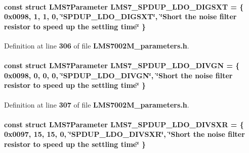 \paragraph[{L\+M\+S7\+\_\+\+S\+P\+D\+U\+P\+\_\+\+L\+D\+O\+\_\+\+D\+I\+G\+S\+XT}]{\setlength{\rightskip}{0pt plus 5cm}const struct {\bf L\+M\+S7\+Parameter} L\+M\+S7\+\_\+\+S\+P\+D\+U\+P\+\_\+\+L\+D\+O\+\_\+\+D\+I\+G\+S\+XT = \{ 0x0098, 1, 1, 0, \char`\"{}\+S\+P\+D\+U\+P\+\_\+\+L\+D\+O\+\_\+\+D\+I\+G\+S\+X\+T\char`\"{}, \char`\"{}\+Short the noise filter resistor to speed up the settling time\char`\"{} \}\hspace{0.3cm}{\ttfamily [static]}}\label{LMS7002M__parameters_8h_ab45f4ce54233a2500de5a14d051e3f05}


Definition at line {\bf 306} of file {\bf L\+M\+S7002\+M\+\_\+parameters.\+h}.

\paragraph[{L\+M\+S7\+\_\+\+S\+P\+D\+U\+P\+\_\+\+L\+D\+O\+\_\+\+D\+I\+V\+GN}]{\setlength{\rightskip}{0pt plus 5cm}const struct {\bf L\+M\+S7\+Parameter} L\+M\+S7\+\_\+\+S\+P\+D\+U\+P\+\_\+\+L\+D\+O\+\_\+\+D\+I\+V\+GN = \{ 0x0098, 0, 0, 0, \char`\"{}\+S\+P\+D\+U\+P\+\_\+\+L\+D\+O\+\_\+\+D\+I\+V\+G\+N\char`\"{}, \char`\"{}\+Short the noise filter resistor to speed up the settling time\char`\"{} \}\hspace{0.3cm}{\ttfamily [static]}}\label{LMS7002M__parameters_8h_ab45a2aff27856fa45303719648c3e2c4}


Definition at line {\bf 307} of file {\bf L\+M\+S7002\+M\+\_\+parameters.\+h}.

\paragraph[{L\+M\+S7\+\_\+\+S\+P\+D\+U\+P\+\_\+\+L\+D\+O\+\_\+\+D\+I\+V\+S\+XR}]{\setlength{\rightskip}{0pt plus 5cm}const struct {\bf L\+M\+S7\+Parameter} L\+M\+S7\+\_\+\+S\+P\+D\+U\+P\+\_\+\+L\+D\+O\+\_\+\+D\+I\+V\+S\+XR = \{ 0x0097, 15, 15, 0, \char`\"{}\+S\+P\+D\+U\+P\+\_\+\+L\+D\+O\+\_\+\+D\+I\+V\+S\+X\+R\char`\"{}, \char`\"{}\+Short the noise filter resistor to speed up the settling time\char`\"{} \}\hspace{0.3cm}{\ttfamily [static]}}\label{LMS7002M__parameters_8h_adc577823ccd5a3625c0e71ba1812fa44}


